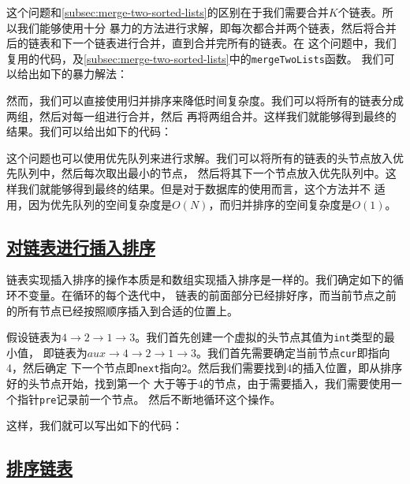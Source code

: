 \documentclass[../../main.tex]{subfiles}
\begin{document}
这个问题和\ref{subsec:merge-two-sorted-lists}的区别在于我们需要合并$K$个链表。所以我们能够使用十分
暴力的方法进行求解，即每次都合并两个链表，然后将合并后的链表和下一个链表进行合并，直到合并完所有的链表。在
这个问题中，我们复用的代码，及\ref{subsec:merge-two-sorted-lists}中的\verb|mergeTwoLists|函数。
我们可以给出如下的暴力解法：



然而，我们可以直接使用归并排序来降低时间复杂度。我们可以将所有的链表分成两组，然后对每一组进行合并，然后
再将两组合并。这样我们就能够得到最终的结果。我们可以给出如下的代码：



\begin{kaobox}[title=使用优先队列]
  这个问题也可以使用优先队列来进行求解。我们可以将所有的链表的头节点放入优先队列中，然后每次取出最小的节点，
  然后将其下一个节点放入优先队列中。这样我们就能够得到最终的结果。但是对于数据库的使用而言，这个方法并不
  适用，因为优先队列的空间复杂度是$O(N)$，而归并排序的空间复杂度是$O(1)$。
\end{kaobox}

\subsection{\href{https://leetcode.cn/problems/insertion-sort-list/}{对链表进行插入排序}}
\label{subsec:insertion-sort-list}

链表实现插入排序的操作本质是和数组实现插入排序是一样的。我们确定如下的循环不变量。在循环的每个迭代中，
链表的前面部分已经排好序，而当前节点之前的所有节点已经按照顺序插入到合适的位置上。

\begin{example}
  假设链表为$4 \to 2 \to 1 \to 3$。我们首先创建一个虚拟的头节点其值为\texttt{int}类型的最小值，
  即链表为$aux \to 4 \to 2 \to 1 \to 3$。我们首先需要确定当前节点\texttt{cur}即指向4，然后确定
  下一个节点即\texttt{next}指向2。然后我们需要找到4的插入位置，即从排序好的头节点开始，找到第一个
  大于等于4的节点，由于需要插入，我们需要使用一个指针\texttt{pre}记录前一个节点。
  然后不断地循环这个操作。
\end{example}

这样，我们就可以写出如下的代码：



\subsection{\href{https://leetcode.cn/problems/sort-list/}{排序链表}}
\end{document}
